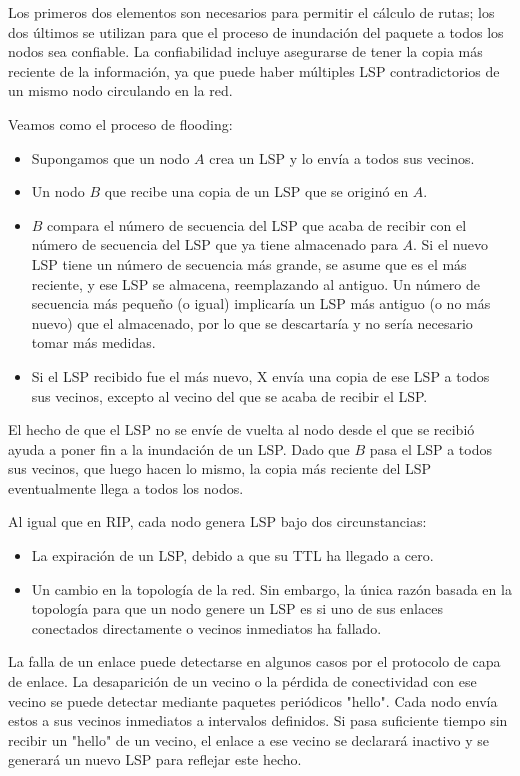 Los primeros dos elementos son necesarios para permitir el cálculo de rutas; los dos últimos se utilizan para que el proceso de inundación del paquete a todos los nodos sea confiable. La confiabilidad incluye asegurarse de tener la copia más reciente de la información, ya que puede haber múltiples LSP contradictorios de un mismo nodo circulando en la red.

Veamos como el proceso de flooding: 
\begin{itemize}
  \item Supongamos que un nodo \(A\) crea un LSP y lo envía a todos sus vecinos.
  \item Un nodo \(B\) que recibe una copia de un LSP que se originó en \(A\).
  \item \(B\) compara el número de secuencia del LSP que acaba de recibir con el número de secuencia del LSP que ya tiene almacenado para \(A\). Si el nuevo LSP tiene un número de secuencia más grande, se asume que es el más reciente, y ese LSP se almacena, reemplazando al antiguo. Un número de secuencia más pequeño (o igual) implicaría un LSP más antiguo (o no más nuevo) que el almacenado, por lo que se descartaría y no sería necesario tomar más medidas.
  \item Si el LSP recibido fue el más nuevo, X envía una copia de ese LSP a todos sus vecinos, excepto al vecino del que se acaba de recibir el LSP.
\end{itemize}

El hecho de que el LSP no se envíe de vuelta al nodo desde el que se recibió ayuda a poner fin a la inundación de un LSP. Dado que \(B\) pasa el LSP a todos sus vecinos, que luego hacen lo mismo, la copia más reciente del LSP eventualmente llega a todos los nodos.

Al igual que en RIP, cada nodo genera LSP bajo dos circunstancias:
\begin{itemize}
  \item La expiración de un LSP, debido a que su TTL ha llegado a cero.
  \item Un cambio en la topología de la red. Sin embargo, la única razón basada en la topología para que un nodo genere un LSP es si uno de sus enlaces conectados directamente o vecinos inmediatos ha fallado.
\end{itemize}

La falla de un enlace puede detectarse en algunos casos por el protocolo de capa de enlace. La desaparición de un vecino o la pérdida de conectividad con ese vecino se puede detectar mediante paquetes periódicos "hello". Cada nodo envía estos a sus vecinos inmediatos a intervalos definidos. Si pasa suficiente tiempo sin recibir un "hello" de un vecino, el enlace a ese vecino se declarará inactivo y se generará un nuevo LSP para reflejar este hecho.

